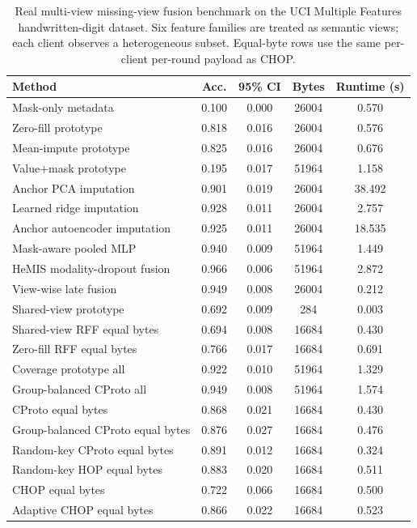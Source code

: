 \documentclass[preprint]{elsarticle}
\renewcommand{\arraystretch}{1.08}
\begin{document}
\begin{table}[t]
\centering
\caption{Real multi-view missing-view fusion benchmark on the UCI Multiple Features handwritten-digit dataset. Six feature families are treated as semantic views; each client observes a heterogeneous subset. Equal-byte rows use the same per-client per-round payload as CHOP.}
\label{tab:if-mfeat-fusion}
\scriptsize
\setlength{\tabcolsep}{3pt}
\renewcommand{\arraystretch}{0.94}
\begin{tabular}{lcccc}
\toprule
Method & Acc. & 95\% CI & Bytes & Runtime (s) \\
\midrule
Mask-only metadata & 0.100 & 0.000 & 26004 & 0.570 \\
Zero-fill prototype & 0.818 & 0.016 & 26004 & 0.576 \\
Mean-impute prototype & 0.825 & 0.016 & 26004 & 0.676 \\
Value+mask prototype & 0.195 & 0.017 & 51964 & 1.158 \\
Anchor PCA imputation & 0.901 & 0.019 & 26004 & 38.492 \\
Learned ridge imputation & 0.928 & 0.011 & 26004 & 2.757 \\
Anchor autoencoder imputation & 0.925 & 0.011 & 26004 & 18.535 \\
Mask-aware pooled MLP & 0.940 & 0.009 & 51964 & 1.449 \\
HeMIS modality-dropout fusion & 0.966 & 0.006 & 51964 & 2.872 \\
View-wise late fusion & 0.949 & 0.008 & 26004 & 0.212 \\
Shared-view prototype & 0.692 & 0.009 & 284 & 0.003 \\
Shared-view RFF equal bytes & 0.694 & 0.008 & 16684 & 0.430 \\
Zero-fill RFF equal bytes & 0.766 & 0.017 & 16684 & 0.691 \\
Coverage prototype all & 0.922 & 0.010 & 51964 & 1.329 \\
Group-balanced CProto all & 0.949 & 0.008 & 51964 & 1.574 \\
CProto equal bytes & 0.868 & 0.021 & 16684 & 0.430 \\
Group-balanced CProto equal bytes & 0.876 & 0.027 & 16684 & 0.476 \\
Random-key CProto equal bytes & 0.891 & 0.012 & 16684 & 0.324 \\
Random-key HOP equal bytes & 0.883 & 0.020 & 16684 & 0.511 \\
CHOP equal bytes & 0.722 & 0.066 & 16684 & 0.500 \\
Adaptive CHOP equal bytes & 0.866 & 0.022 & 16684 & 0.523 \\
\bottomrule
\end{tabular}
\end{table}
\end{document}
